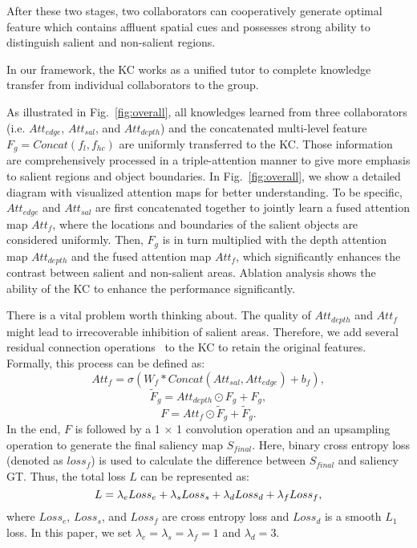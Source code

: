 \documentclass[runningheads]{llncs}
\begin{document}
After these two stages, two collaborators can cooperatively generate optimal feature which contains affluent spatial cues and possesses strong ability to distinguish salient and non-salient regions.

\label{subsection:3.4}
In our framework, the KC works as a unified tutor to complete knowledge transfer from individual collaborators to the group.

As illustrated in Fig.~\ref{fig:overall}, all knowledges learned from three collaborators (i.e. $Att_{edge}$, $Att_{sal}$, and $Att_{depth}$) and the concatenated multi-level feature $F_g=Concat(f_l,f_{hc})$ are uniformly transferred to the KC. Those information are comprehensively processed in a triple-attention manner to give more emphasis to salient regions and object boundaries.
In Fig.~\ref{fig:overall}, we show a detailed diagram with visualized attention maps for better understanding.
To be specific, $Att_{edge}$ and $Att_{sal}$ are first concatenated together to jointly learn a fused attention map $Att_f$, where the locations and boundaries of the salient objects are considered uniformly.
Then, $F_g$  is in turn multiplied with the depth attention map $Att_{depth}$ and the fused attention map $Att_f$, which significantly enhances the contrast between salient and non-salient areas.
Ablation analysis shows the ability of the KC to enhance the performance significantly.

There is a vital problem worth thinking about.
The quality of $Att_{depth}$ and $Att_f$ might lead to irrecoverable inhibition of salient areas.
Therefore, we add several residual connection operations~\cite{ResNet} to the KC to retain the original features.
Formally, this process can be defined as:
\begin{equation}
Att_{f} = \sigma(W_f*Concat(Att_{sal}, Att_{edge})+b_f),
\end{equation}
\begin{equation}
\widetilde{F}_g = Att_{depth}\odot F_g+F_g,
\end{equation}
\begin{equation}
F = Att_f\odot \widetilde{F}_g+\widetilde{F}_g.
\end{equation}
In the end, $F$ is followed by a 1 $\times$ 1 convolution operation and an upsampling operation to generate the final saliency map $S_{final}$.
Here, binary cross entropy loss (denoted as $loss_{f}$) is used to calculate the difference between $S_{final}$ and saliency GT.
Thus, the total loss $L$ can be represented as:
\begin{equation}
\begin{small}
L = \lambda_eLoss_{e}+\lambda_sLoss_{s}+\lambda_dLoss_{d}+\lambda_fLoss_{f},
\end{small}
\end{equation}
where $Loss_e$, $Loss_s$, and $Loss_f$ are cross entropy loss and $Loss_d$ is a smooth $L_1$ loss.
In this paper, we set $\lambda_e=\lambda_s=\lambda_f=1$ and $\lambda_d=3$.
\end{document}
